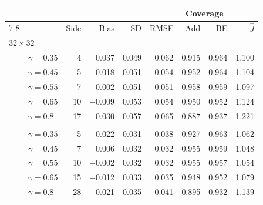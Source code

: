 \begin{tabular}{llrrrrrrr}
\toprule
 &  & \multicolumn{4}{c}{} & \multicolumn{2}{c}{Coverage} &  \\ \cmidrule(lr){7-8}
 &  & Side & Bias & SD & RMSE & Add & BE & $\widehat J$ \\
\midrule
\multicolumn{9}{l}{\emph{$32\times32$}} \\
 & $\gamma=0.35$ & 4 & 0.037 & 0.049 & 0.062 & 0.915 & 0.964 & 1.100 \\
 & $\gamma=0.45$ & 5 & 0.018 & 0.051 & 0.054 & 0.952 & 0.964 & 1.104 \\
 & $\gamma=0.55$ & 7 & 0.002 & 0.051 & 0.051 & 0.958 & 0.959 & 1.097 \\
 & $\gamma=0.65$ & 10 & $-$0.009 & 0.053 & 0.054 & 0.950 & 0.952 & 1.124 \\
 & $\gamma=0.8$ & 17 & $-$0.030 & 0.057 & 0.065 & 0.887 & 0.937 & 1.221 \\
\addlinespace
\multicolumn{9}{l}{\emph{$64\times64$}} \\
 & $\gamma=0.35$ & 5 & 0.022 & 0.031 & 0.038 & 0.927 & 0.963 & 1.062 \\
 & $\gamma=0.45$ & 7 & 0.006 & 0.032 & 0.032 & 0.955 & 0.959 & 1.048 \\
 & $\gamma=0.55$ & 10 & $-$0.002 & 0.032 & 0.032 & 0.955 & 0.957 & 1.054 \\
 & $\gamma=0.65$ & 15 & $-$0.012 & 0.033 & 0.035 & 0.948 & 0.952 & 1.079 \\
 & $\gamma=0.8$ & 28 & $-$0.021 & 0.035 & 0.041 & 0.895 & 0.932 & 1.139 \\
\bottomrule
\end{tabular}
